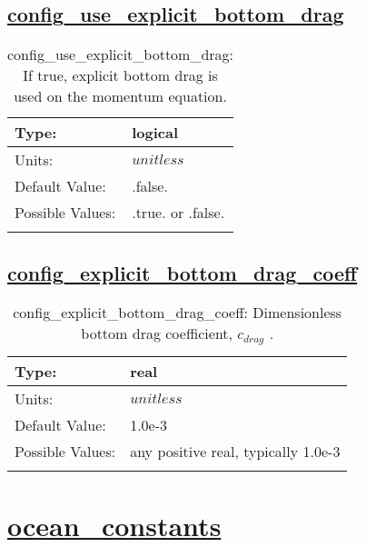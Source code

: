 \subsection[config\_use\_explicit\_bottom\_drag]{\hyperref[sec:nm_tab_bottom_drag]{config\_use\_explicit\_bottom\_drag}}
\label{subsec:nm_sec_config_use_explicit_bottom_drag}
\begin{center}
\begin{longtable}{| p{2.0in} || p{4.0in} |}
    \hline
    Type: & logical \\
    \hline
    Units: & $unitless$ \\
    \hline
    Default Value: & .false. \\
    \hline
    Possible Values: & .true. or .false. \\
    \hline
    \caption{config\_use\_explicit\_bottom\_drag: If true, explicit bottom drag is used on the momentum equation.}
\end{longtable}
\end{center}
\subsection[config\_explicit\_bottom\_drag\_coeff]{\hyperref[sec:nm_tab_bottom_drag]{config\_explicit\_bottom\_drag\_coeff}}
\label{subsec:nm_sec_config_explicit_bottom_drag_coeff}
\begin{center}
\begin{longtable}{| p{2.0in} || p{4.0in} |}
    \hline
    Type: & real \\
    \hline
    Units: & $unitless$ \\
    \hline
    Default Value: & 1.0e-3 \\
    \hline
    Possible Values: & any positive real, typically 1.0e-3 \\
    \hline
    \caption{config\_explicit\_bottom\_drag\_coeff:  Dimensionless bottom drag coefficient,  $c_{drag}$ .}
\end{longtable}
\end{center}
\section[ocean\_constants]{\hyperref[sec:nm_tab_ocean_constants]{ocean\_constants}}
\label{sec:nm_sec_ocean_constants}
